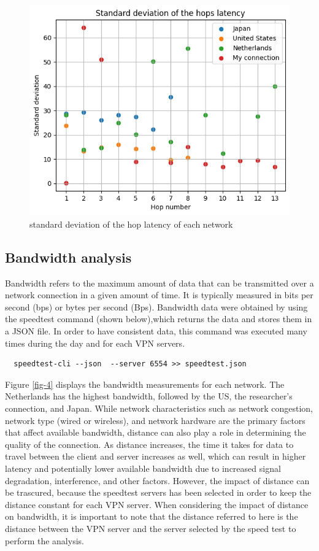 \documentclass[eng]{class}
\begin{document}
\begin{figure}[H]
  \centering
  \includegraphics[width=.7\columnwidth]{images/varLHops.png}
  \caption{standard deviation of the hop latency of each network}
  \label{fig-3}
\end{figure}

\subsection{Bandwidth analysis}
Bandwidth refers to the maximum amount of data that can be transmitted over a network connection in a given amount of time.
It is typically measured in bits per second (bps) or bytes per second (Bps).
Bandwidth data were obtained by using the speedtest command (shown below),which returns the data and stores them in a JSON file.
In order to have consistent data, this command was executed many times during the day and for each VPN servers.
\begin{lstlisting}
  speedtest-cli --json  --server 6554 >> speedtest.json
\end{lstlisting}
Figure \ref*{fig-4} displays the bandwidth measurements for each network.
The Netherlands has the highest bandwidth, followed by the US, the researcher's connection, and Japan.\newline
While network characteristics such as network congestion, network type (wired or wireless),
and network hardware are the primary factors that affect available bandwidth, distance can also play a role in determining the quality of the connection.
As distance increases, the time it takes for data to travel between the client and server increases as well,
which can result in higher latency and potentially lower available bandwidth due to increased signal degradation, interference, and other factors.
However, the impact of distance can be trascured, because the speedtest servers has been selected in order to keep the distance constant for each VPN server.\newline
When considering the impact of distance on bandwidth, it is important to note that the distance referred to here is the distance between the VPN server and
the server selected by the speed test to perform the analysis.
\end{document}
